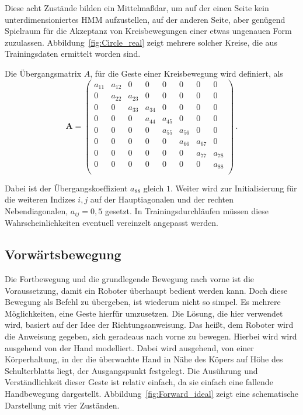 Diese acht Zust\"ande bilden ein Mittelma\ss dar, um auf der einen Seite kein unterdimensioniertes \gls{HMM} aufzustellen, auf der anderen Seite, aber gen\"ugend Spielraum f\"ur die Akzeptanz von Kreisbewegungen einer etwas ungenauen Form zuzulassen. Abbildung~\ref{fig:Circle_real} zeigt mehrere solcher Kreise, die aus Trainingsdaten ermittelt worden sind.


Die \"Ubergangsmatrix $A$, f\"ur die Geste einer Kreisbewegung wird definiert, als
\begin{equation}
\mathbf{A} = 
\begin{pmatrix}
a_{11} & a_{12} & 0 & 0 & 0 & 0 & 0 & 0 \\
0 & a_{22} & a_{23} & 0 & 0 & 0 & 0 & 0 \\
0 & 0 & a_{33} & a_{34} & 0 & 0 & 0 & 0 \\
0 & 0 & 0 & a_{44} & a_{45} & 0 & 0 & 0 \\
0 & 0 & 0 & 0 & a_{55} & a_{56} & 0 & 0 \\
0 & 0 & 0 & 0 & 0 & a_{66} & a_{67} & 0 \\
0 & 0 & 0 & 0 & 0 & 0 & a_{77} & a_{78} \\
0 & 0 & 0 & 0 & 0 & 0 & 0 & a_{88} \\
\end{pmatrix} \, .
\end{equation}

Dabei ist der \"Ubergangskoeffizient $a_{88}$ gleich $1$. Weiter wird zur Initialisierung f\"ur die weiteren Indizes $i, j$ auf der Hauptiagonalen und der rechten Nebendiagonalen, $a_{ij} = 0,5$ gesetzt. In Trainingsdurchl\"aufen m\"ussen diese Wahrscheinlichkeiten eventuell vereinzelt angepasst werden.

\subsection{Vorw\"artsbewegung}

Die Fortbewegung und die grundlegende Bewegung nach vorne ist die Voraussetzung, damit ein Roboter \"uberhaupt bedient werden kann. Doch diese Bewegung als Befehl zu \"ubergeben, ist wiederum nicht so simpel. Es mehrere M\"oglichkeiten, eine Geste hierf\"ur umzusetzen. Die L\"osung, die hier verwendet wird, basiert auf der Idee der Richtungsanweisung. Das hei\ss t, dem Roboter wird die Anweisung gegeben, sich geradeaus nach vorne zu bewegen.
\newline
Hierbei wird wird ausgehend von der Hand modelliert. Dabei wird ausgehend, von einer K\"orperhaltung, in der die \"uberwachte Hand in N\"ahe des K\"opers auf H\"ohe des Schulterblatts liegt, der Ausgangspunkt festgelegt. Die Aus\"uhrung und Verst\"andlichkeit dieser Geste ist relativ einfach, da sie einfach eine fallende Handbewegung dargestellt. Abbildung~\ref{fig:Forward_ideal} zeigt eine schematische Darstellung mit vier Zust\"anden.

